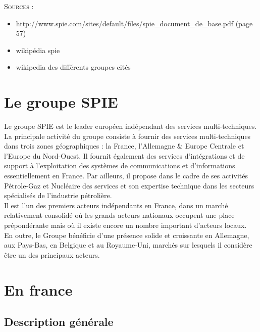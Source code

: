 \begin{shaded}
    \textsc{Sources} :
    \begin{itemize}
        \item[\textbullet] http://www.spie.com/sites/default/files/spie\_document\_de\_base.pdf (page 57)
        \item[\textbullet] wikipédia spie
        \item[\textbullet] wikipedia des différents groupes cités
    \end{itemize}
\end{shaded}

\section{Le groupe SPIE}

Le groupe SPIE est le leader européen indépendant des services multi-techniques. \\

La principale activité du groupe consiste à fournir des services multi-techniques dans trois zones géographiques : la France, l’Allemagne \& Europe Centrale et l’Europe du Nord-Ouest. Il fournit également des services d’intégrations et de support à l’exploitation des systèmes de communications et d’informations essentiellement en France. Par ailleurs, il propose  dans le cadre de ses activités Pétrole-Gaz et Nucléaire des services et son expertise technique dans les secteurs spécialisés de l’industrie pétrolière. \\

Il est l’un des premiers acteurs indépendants en France, dans un marché relativement consolidé où les grands acteurs nationaux occupent une place prépondérante mais où il existe encore un nombre important d’acteurs locaux. \\ 

En outre, le Groupe bénéficie d’une présence solide et croissante en Allemagne, aux Pays-Bas, en Belgique et au Royaume-Uni, marchés sur lesquels il considère être un des principaux acteurs.

\section{En france}

\subsection{Description générale}

